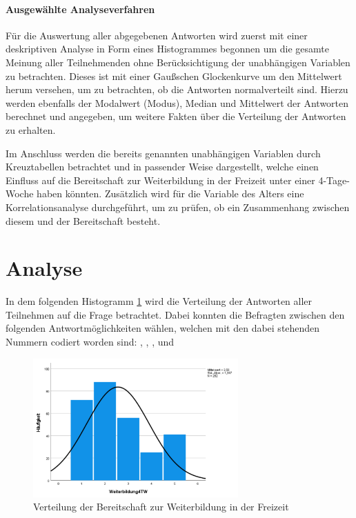 \paragraph*{Ausgewählte Analyseverfahren}

Für die Auswertung aller abgegebenen Antworten wird zuerst mit einer deskriptiven Analyse in Form eines Histogrammes
begonnen um die gesamte Meinung aller Teilnehmenden ohne Berücksichtigung der unabhängigen Variablen zu betrachten. 
Dieses ist mit einer Gaußschen Glockenkurve um den Mittelwert herum versehen, um zu betrachten, ob die Antworten 
normalverteilt sind. %
Hierzu werden ebenfalls der Modalwert (Modus), Median und Mittelwert der Antworten berechnet und angegeben,
um weitere Fakten über die Verteilung der Antworten zu erhalten. %

Im Anschluss werden die bereits genannten unabhängigen Variablen durch Kreuztabellen betrachtet und
in passender Weise dargestellt, welche einen Einfluss auf die Bereitschaft zur Weiterbildung in der 
Freizeit unter einer 4-Tage-Woche haben könnten. 
Zusätzlich wird für die Variable des Alters eine Korrelationsanalyse durchgeführt, um zu prüfen, ob 
ein Zusammenhang zwischen diesem und der Bereitschaft besteht.



\section{Analyse}

In dem folgenden Histogramm \ref{fig:bereitschaft_weiterbildung_verteilung} wird die Verteilung 
der Antworten aller Teilnehmen auf die Frage  betrachtet. Dabei konnten die Befragten zwischen den folgenden
Antwortmöglichkeiten wählen, welchen mit den dabei stehenden Nummern codiert worden sind:
 , , ,  und 

\begin{figure}[h]
    \centering
    \includegraphics[width=0.7\textwidth]{04_Artefakte/01_Abbildungen/hypothese_9/histogramm_weiterbildung.png}
    \caption{Verteilung der Bereitschaft zur Weiterbildung in der Freizeit}
    \label{fig:bereitschaft_weiterbildung_verteilung}
\end{figure}

